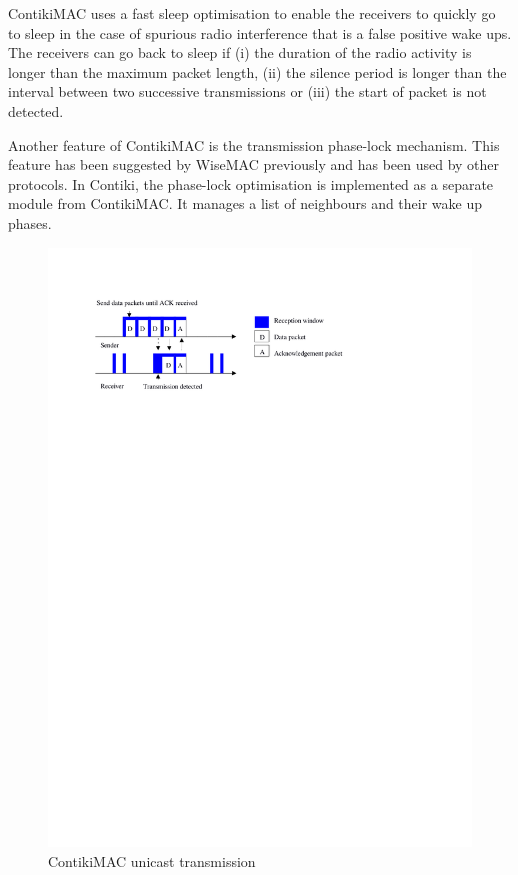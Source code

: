 ContikiMAC uses a fast sleep optimisation to enable the receivers to quickly go to sleep in the case of spurious radio interference that is a false positive wake ups. The receivers can go back to sleep if (i) the duration of the radio activity is longer than the maximum packet length, (ii) the silence period is longer than the interval between two successive transmissions or (iii) the start of packet is not detected.

Another feature of ContikiMAC is the transmission phase-lock mechanism. This feature has been suggested by WiseMAC \cite{wisemac} previously and has been used by other protocols. In Contiki, the phase-lock optimisation is implemented as a separate module from ContikiMAC. It manages a list of neighbours and their wake up phases. 

\begin{figure}
\centering
\includegraphics[trim=2cm 22cm 6cm 2cm, clip=true, totalheight=0.25\textheight]{contikimac.pdf}
\caption{ContikiMAC unicast transmission}
\label{fig_contikimac}
\end{figure}

